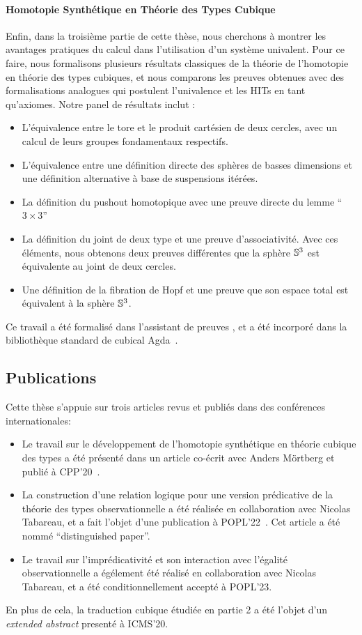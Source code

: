 \paragraph{Homotopie Synthétique en Théorie des Types Cubique}
% 
Enfin, dans la troisième partie de cette thèse, nous cherchons à montrer les 
avantages pratiques du calcul dans l'utilisation d'un système univalent.
% 
Pour ce faire, nous formalisons plusieurs résultats classiques de la théorie 
de l'homotopie en théorie des types cubiques, et nous comparons les preuves 
obtenues avec des formalisations analogues qui postulent l'univalence et les
HITs en tant qu'axiomes. 
% 
Notre panel de résultats inclut :
%
\begin{itemize}
\item L'équivalence entre le tore et le produit cartésien de deux cercles,
  avec un calcul de leurs groupes fondamentaux respectifs.
\item L'équivalence entre une définition directe des sphères de basses 
  dimensions et une définition alternative à base de suspensions itérées.
\item La définition du pushout homotopique avec une preuve directe du lemme
  ``\( 3 \times 3 \)''
\item La définition du joint de deux type et une preuve d'associativité. 
  Avec ces éléments, nous obtenons deux preuves différentes que la sphère $\mathbb{S}^3$
  est équivalente au joint de deux cercles.
\item Une définition de la fibration de Hopf et une preuve que son espace total
  est équivalent à la sphère $\mathbb{S}^3$.
\end{itemize}

Ce travail a été formalisé dans l'assistant de preuves \Agda, et a été incorporé dans
la bibliothèque standard de cubical Agda~.

\subsection{Publications}

Cette thèse s'appuie sur trois articles revus et publiés dans des conférences internationales:
\begin{itemize}
\item Le travail sur le développement de l'homotopie synthétique en théorie
  cubique des types a été présenté dans un article co-écrit avec Anders 
  Mörtberg et publié à CPP'20~.
\item La construction d'une relation logique pour une version prédicative
  de la théorie des types observationnelle a été réalisée en collaboration
  avec Nicolas Tabareau, et a fait l'objet d'une publication à POPL'22~.
  Cet article a été nommé ``distinguished paper''.
\item Le travail sur l'imprédicativité et son interaction avec l'égalité 
  observationnelle a égélement été réalisé en collaboration avec Nicolas
  Tabareau, et a été conditionnellement accepté à POPL'23. 
\end{itemize}
En plus de cela, la traduction cubique étudiée en partie 2 a été l'objet d'un
\emph{extended abstract} presenté à ICMS'20.

